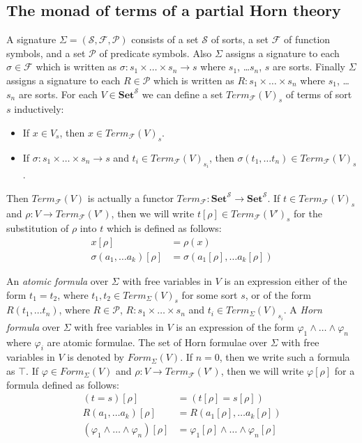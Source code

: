 \documentclass[reqno]{amsart}
\theoremstyle{definition}
\theoremstyle{remark}
\newcommand{\cat}[1]{\mathbf{#1}}
\newcommand{\Set}{\cat{Set}}
\numberwithin{figure}{section}
\begin{document}
\subsection{The monad of terms of a partial Horn theory}

A signature $\Sigma = (\mathcal{S}, \mathcal{F}, \mathcal{P})$ consists of a set $\mathcal{S}$ of sorts, a set $\mathcal{F}$ of function symbols, and a set $\mathcal{P}$ of predicate symbols.
Also $\Sigma$ assigns a signature to each $\sigma \in \mathcal{F}$ which is written as $\sigma : s_1 \times \ldots \times s_n \to s$ where $s_1$, \ldots $s_n$, $s$ are sorts.
Finally $\Sigma$ assigns a signature to each $R \in \mathcal{P}$ which is written as $R : s_1 \times \ldots \times s_n$ where $s_1$, \ldots $s_n$ are sorts.
For each $V \in \Set^\mathcal{S}$ we can define a set $Term_\mathcal{F}(V)_s$ of terms of sort $s$ inductively:
\begin{itemize}
\item If $x \in V_s$, then $x \in Term_\mathcal{F}(V)_s$.
\item If $\sigma : s_1 \times \ldots \times s_n \to s$ and $t_i \in Term_\mathcal{F}(V)_{s_i}$, then $\sigma(t_1, \ldots t_n) \in Term_\mathcal{F}(V)_s$.
\end{itemize}
Then $Term_\mathcal{F}(V)$ is actually a functor $Term_\mathcal{F} : \Set^\mathcal{S} \to \Set^\mathcal{S}$.
If $t \in Term_\mathcal{F}(V)_s$ and $\rho : V \to Term_\mathcal{F}(V')$, then we will write $t[\rho] \in Term_\mathcal{F}(V')_s$
for the substitution of $\rho$ into $t$ which is defined as follows:
\begin{align*}
x[\rho] & = \rho(x) \\
\sigma(a_1, \ldots a_k)[\rho] & = \sigma(a_1[\rho], \ldots a_k[\rho])
\end{align*}

An \emph{atomic formula} over $\Sigma$ with free variables in $V$ is an expression either of the form $t_1 = t_2$, where $t_1, t_2 \in Term_\Sigma(V)_s$ for some sort $s$,
    or of the form $R(t_1, \ldots t_n)$, where $R \in \mathcal{P}$, $R : s_1 \times \ldots \times s_n$ and $t_i \in Term_\Sigma(V)_{s_i}$.
A \emph{Horn formula} over $\Sigma$ with free variables in $V$ is an expression of the form $\varphi_1 \land \ldots \land \varphi_n$ where $\varphi_i$ are atomic formulae.
The set of Horn formulae over $\Sigma$ with free variables in $V$ is denoted by $Form_\Sigma(V)$.
If $n = 0$, then we write such a formula as $\top$.
If $\varphi \in Form_\Sigma(V)$ and $\rho : V \to Term_\mathcal{F}(V')$, then we will write $\varphi[\rho]$ for a formula defined as follows:
\begin{align*}
(t = s)[\rho] & = (t[\rho] = s[\rho]) \\
R(a_1, \ldots a_k)[\rho] & = R(a_1[\rho], \ldots a_k[\rho]) \\
(\varphi_1 \land \ldots \land \varphi_n)[\rho] & = \varphi_1[\rho] \land \ldots \land \varphi_n[\rho]
\end{align*}
\end{document}
